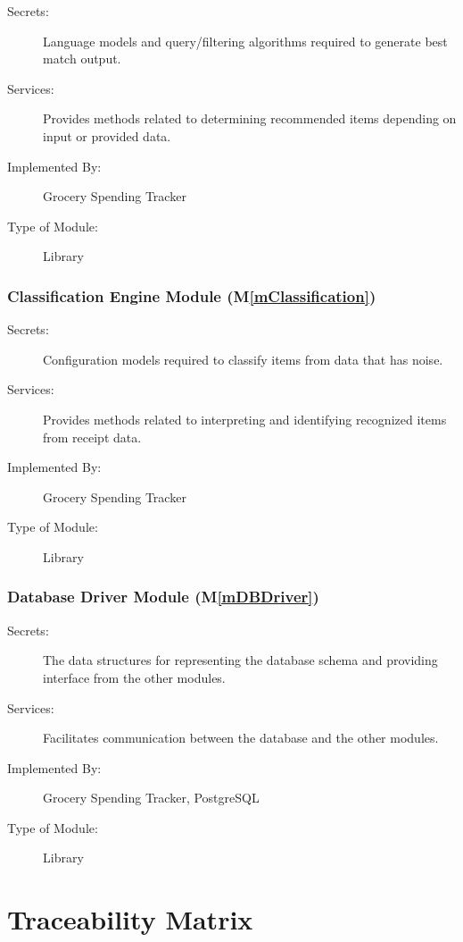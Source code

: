 \documentclass[12pt, titlepage]{article}
\newcommand{\mref}[1]{M\ref{#1}}
\begin{document}
\begin{description}
\item[Secrets:] Language models and query/filtering algorithms required to generate best match output.
\item[Services:] Provides methods related to determining recommended items depending on input or provided data.
\item[Implemented By:] Grocery Spending Tracker
\item[Type of Module:] Library
\end{description}

\subsubsection{Classification Engine Module (\mref{mClassification})}

\begin{description}
\item[Secrets:] Configuration models required to classify items from data that has noise.
\item[Services:] Provides methods related to interpreting and identifying recognized items from receipt data.
\item[Implemented By:] Grocery Spending Tracker
\item[Type of Module:] Library
\end{description}

\subsubsection{Database Driver Module (\mref{mDBDriver})}

\begin{description}
\item[Secrets:] The data structures for representing the database schema and providing interface from the other modules.
\item[Services:] Facilitates communication between the database and the other modules.
\item[Implemented By:] Grocery Spending Tracker, PostgreSQL
\item[Type of Module:] Library
\end{description}

\section{Traceability Matrix} \label{SecTM}
\end{document}
